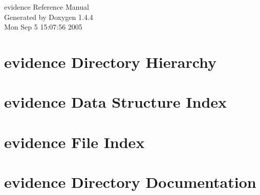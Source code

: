 \documentclass[a4paper]{book}
\begin{document}
\begin{titlepage}
\vspace*{7cm}
\begin{center}
{\Large evidence Reference Manual}\\
\vspace*{1cm}
{\large Generated by Doxygen 1.4.4}\\
\vspace*{0.5cm}
{\small Mon Sep 5 15:07:56 2005}\\
\end{center}
\end{titlepage}
\clearemptydoublepage
{}
\tableofcontents
\clearemptydoublepage
{}
\chapter{evidence Directory Hierarchy}

\chapter{evidence Data Structure Index}

\chapter{evidence File Index}

\chapter{evidence Directory Documentation}


















































\end{document}
